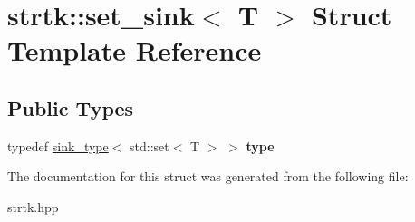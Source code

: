 \hypertarget{structstrtk_1_1set__sink}{\section{strtk\-:\-:set\-\_\-sink$<$ T $>$ Struct Template Reference}
\label{structstrtk_1_1set__sink}
}
\subsection*{Public Types}
\begin{DoxyCompactItemize}
\item 
\hypertarget{structstrtk_1_1set__sink_ad1bd7b09c6992f4d5ab4ae78a325e2b5}{typedef \hyperlink{classstrtk_1_1sink__type}{sink\-\_\-type}$<$ std\-::set$<$ T $>$ $>$ {\bfseries type}}\label{structstrtk_1_1set__sink_ad1bd7b09c6992f4d5ab4ae78a325e2b5}

\end{DoxyCompactItemize}


The documentation for this struct was generated from the following file\-:\begin{DoxyCompactItemize}
\item 
strtk.\-hpp\end{DoxyCompactItemize}
